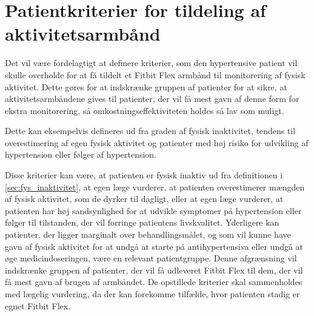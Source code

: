 \section{Patientkriterier for tildeling af aktivitetsarmbånd} \label{sec:kriterier}

Det vil være fordelagtigt at definere kriterier, som den hypertensive patient vil skulle overholde for at få tildelt et Fitbit Flex armbånd til monitorering af fysisk aktivitet. Dette gøres for at indskrænke gruppen af patienter for at sikre, at aktivitetsarmbåndene gives til patienter, der vil få mest gavn af denne form for ekstra monitorering, så omkostningseffektiviteten holdes så lav som muligt.

Dette kan eksempelvis defineres ud fra graden af fysisk inaktivitet, tendens til overestimering af egen fysisk aktivitet og patienter med høj risiko for udvikling af hypertension eller følger af hypertension. 

Disse kriterier kan være, at patienten er fysisk inaktiv ud fra definitionen i \autoref{sec:fys_inaktivitet}, at egen læge vurderer, at patienten overestimerer mængden af fysisk aktivitet, som de dyrker til dagligt, eller at egen læge vurderer, at patienten har høj sandsynlighed for at udvikle symptomer på hypertension eller følger til tilstanden, der vil forringe patientens livskvalitet. Yderligere kan patienter, der ligger marginalt over behandlingsmålet, og som vil kunne have gavn af fysisk aktivitet for at undgå at starte på antihypertensiva eller undgå at øge medicindoseringen, være en relevant patientgruppe. Denne afgrænsning vil indskrænke gruppen af patienter, der vil få udleveret Fitbit Flex til dem, der vil få mest gavn af brugen af armbåndet. 
De opstillede kriterier skal sammenholdes med lægelig vurdering, da der kan forekomme tilfælde, hvor patienten stadig er egnet Fitbit Flex. 

